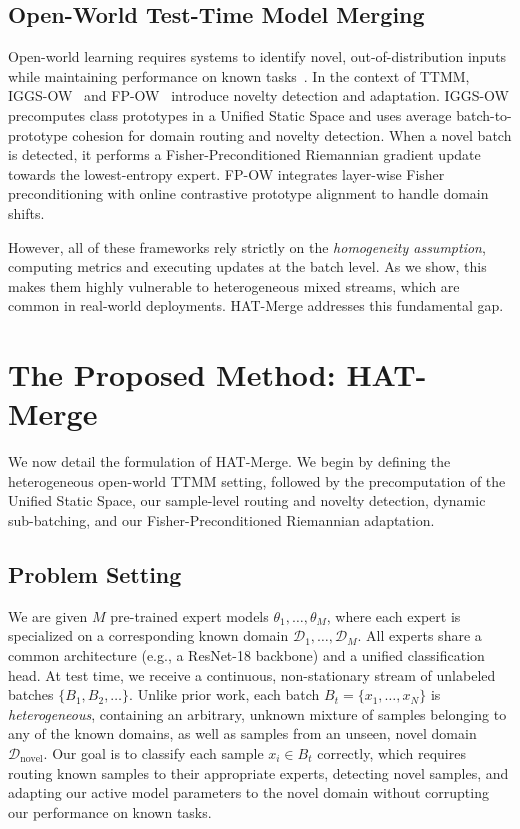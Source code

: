 \documentclass{article}
\theoremstyle{plain}
\theoremstyle{definition}
\theoremstyle{remark}
\begin{document}
\subsection{Open-World Test-Time Model Merging}
Open-world learning requires systems to identify novel, out-of-distribution inputs while maintaining performance on known tasks~\cite{bendale16, hendrycks16, liang18}. In the context of TTMM, IGGS-OW~\cite{iggs_ow} and FP-OW~\cite{fp_ow} introduce novelty detection and adaptation. IGGS-OW precomputes class prototypes in a Unified Static Space and uses average batch-to-prototype cohesion for domain routing and novelty detection. When a novel batch is detected, it performs a Fisher-Preconditioned Riemannian gradient update towards the lowest-entropy expert. FP-OW integrates layer-wise Fisher preconditioning with online contrastive prototype alignment to handle domain shifts. 

However, all of these frameworks rely strictly on the \textit{homogeneity assumption}, computing metrics and executing updates at the batch level. As we show, this makes them highly vulnerable to heterogeneous mixed streams, which are common in real-world deployments. HAT-Merge addresses this fundamental gap.

\section{The Proposed Method: HAT-Merge}
\label{submission_method}
We now detail the formulation of HAT-Merge. We begin by defining the heterogeneous open-world TTMM setting, followed by the precomputation of the Unified Static Space, our sample-level routing and novelty detection, dynamic sub-batching, and our Fisher-Preconditioned Riemannian adaptation.

\subsection{Problem Setting}
We are given $M$ pre-trained expert models $\theta_1, \dots, \theta_M$, where each expert is specialized on a corresponding known domain $\mathcal{D}_1, \dots, \mathcal{D}_M$. All experts share a common architecture (e.g., a ResNet-18 backbone) and a unified classification head. At test time, we receive a continuous, non-stationary stream of unlabeled batches $\{B_1, B_2, \dots\}$. Unlike prior work, each batch $B_t = \{x_1, \dots, x_N\}$ is \textit{heterogeneous}, containing an arbitrary, unknown mixture of samples belonging to any of the known domains, as well as samples from an unseen, novel domain $\mathcal{D}_{\text{novel}}$. Our goal is to classify each sample $x_i \in B_t$ correctly, which requires routing known samples to their appropriate experts, detecting novel samples, and adapting our active model parameters to the novel domain without corrupting our performance on known tasks.
\end{document}
